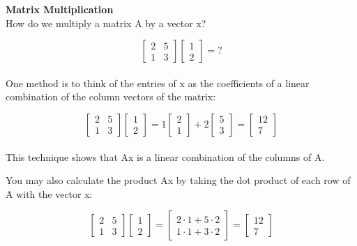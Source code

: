 \documentclass{ximera}
\begin{document}
\noindent
\textbf{Matrix Multiplication}\\
How do we multiply a matrix A by a vector x?\\
\begin{example}

\[\begin{bmatrix} 2 & 5\\ 1 & 3 \end{bmatrix} \begin{bmatrix} 1\\2 \end{bmatrix} = ?\]\\

\noindent
One method is to think of the entries of x as the coefficients of a linear combination of the column vectors of the matrix:

\[\begin{bmatrix} 2 & 5\\ 1 & 3 \end{bmatrix} \begin{bmatrix} 1\\2 \end{bmatrix} = 1\begin{bmatrix} 2\\1 \end{bmatrix} + 2 \begin{bmatrix} 5\\3 \end{bmatrix} = \begin{bmatrix} 12\\7 \end{bmatrix}\]\\

\noindent
This technique shows that Ax is a linear combination of the columns of A. \par 
\noindent
You may also calculate the product Ax by taking the dot product of each row of A with the vector x:

\[\begin{bmatrix} 2 & 5\\ 1 & 3 \end{bmatrix} \begin{bmatrix} 1\\2 \end{bmatrix} = \begin{bmatrix} 2 \cdot 1 + 5 \cdot 2\\ 1 \cdot 1 + 3 \cdot 2 \end{bmatrix} = \begin{bmatrix} 12\\7 \end{bmatrix}\]
\end{example}
\end{document}
